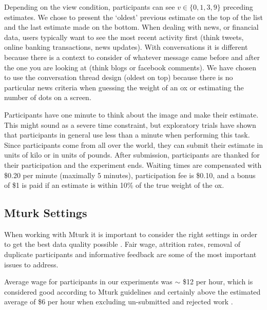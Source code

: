 \documentclass[9pt,twoside,lineno]{pnas-new}
\begin{document}
Depending on the view condition, participants can see $v\in\{0,1,3,9\}$ preceding estimates. We chose to present the ‘oldest’ previous estimate on the top of the list and the last estimate made on the bottom. When dealing with news, or financial data, users typically want to see the most recent activity first (think tweets, online banking transactions, news updates). With conversations it is different because there is a context to consider of whatever message came before and after the one you are looking at (think blogs or facebook comments). We have chosen to use the conversation thread design (oldest on top) because there is no particular news criteria when guessing the weight of an ox or estimating the number of dots on a screen.

Participants have one minute to think about the image and make their estimate. This might sound as a severe time constraint, but exploratory trials have shown that participants in general use less than a minute when performing this task. Since participants come from all over the world, they can submit their estimate in units of kilo or in units of pounds. After submission, participants are thanked for their participation and the experiment ends. Waiting times are compensated with \$0.20 per minute (maximally 5 minutes), participation fee is \$0.10, and a bonus of \$1 is paid if an estimate is within 10\% of the true weight of the ox.

\subsection*{Mturk Settings}
When working with Mturk it is important to consider the right settings in order to get the best data quality possible \cite{chandler2016conducting}. Fair wage, attrition rates, removal of duplicate participants and informative feedback are some of the most important issues to address.

Average wage for participants in our experiments was $\sim$ \$12 per hour, which is considered good according to Mturk guidelines and certainly above the estimated average of \$6 per hour when excluding un-submitted and rejected work \cite{hara2018data}.
\end{document}
